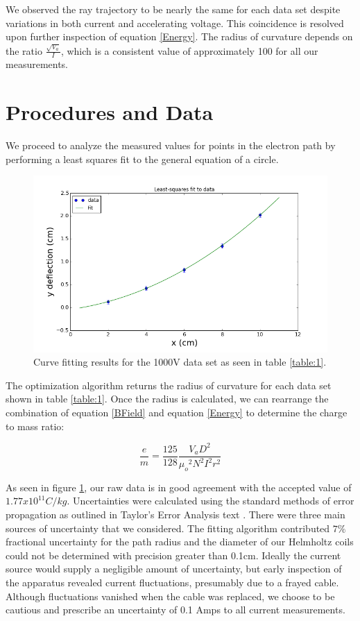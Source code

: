 \documentclass[12pt]{article}
\begin{document}
We observed the ray trajectory to be nearly the same for each data set despite variations in both current and accelerating voltage. This coincidence is resolved upon further inspection of equation \ref{Energy}. The radius of curvature depends  on the ratio $\frac{\sqrt{V_a}}{I}$, which is a consistent value of approximately 100 for all our measurements.
    
\section{Procedures and Data}
We proceed to analyze the measured values for points in the electron path by performing a least squares fit to the general equation of a circle. 

\begin{figure}[h!]
  \centering
  \includegraphics[width=1\textwidth]{Sample.png}
  \caption{Curve fitting results for the 1000V data set as seen in table \ref{table:1}. }
\label{Curve}
\end{figure}

The optimization algorithm returns the radius of curvature for each data set shown in table \ref{table:1}. Once the radius is calculated, we can rearrange the combination of equation \ref{BField} and equation \ref{Energy} to determine the charge to mass ratio: 

\begin{equation}
\frac{e}{m} = \frac{125}{128}\frac{V_a D^2}{{{\mu}_o}^2 N^2 I^2 r^2} 
\end{equation}

As seen in figure \ref{Curve}, our raw data is in good agreement with the accepted value of $1.77x10^11 C/kg$. Uncertainties were calculated using the standard methods of error propagation as outlined in Taylor's Error Analysis text \cite{Taylor1997AnAnalysis}. There were three main sources of uncertainty that we considered. The fitting algorithm contributed $7\% $ fractional uncertainty for the path radius and the diameter of our Helmholtz coils could not be determined with precision greater than 0.1cm. Ideally the current source would supply a negligible amount of uncertainty, but early inspection of the apparatus revealed current fluctuations, presumably due to a frayed cable. Although fluctuations vanished when the cable was replaced, we choose to be cautious and prescribe an uncertainty of 0.1 Amps to all current measurements. 
\end{document}
